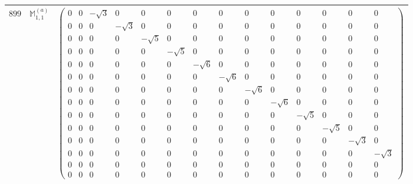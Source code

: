 \documentclass[fleqn,8pt,landscape]{jsarticle}
\begin{document}
\begin{center}
\begin{longtable}{ccc}
$ 899 $ & $ \mathbb{M}_{1,1}^{(a)} $ & $ \begin{pmatrix} 0 & 0 & - \sqrt{3} & 0 & 0 & 0 & 0 & 0 & 0 & 0 & 0 & 0 & 0 & 0 \\ 0 & 0 & 0 & - \sqrt{3} & 0 & 0 & 0 & 0 & 0 & 0 & 0 & 0 & 0 & 0 \\ 0 & 0 & 0 & 0 & - \sqrt{5} & 0 & 0 & 0 & 0 & 0 & 0 & 0 & 0 & 0 \\ 0 & 0 & 0 & 0 & 0 & - \sqrt{5} & 0 & 0 & 0 & 0 & 0 & 0 & 0 & 0 \\ 0 & 0 & 0 & 0 & 0 & 0 & - \sqrt{6} & 0 & 0 & 0 & 0 & 0 & 0 & 0 \\ 0 & 0 & 0 & 0 & 0 & 0 & 0 & - \sqrt{6} & 0 & 0 & 0 & 0 & 0 & 0 \\ 0 & 0 & 0 & 0 & 0 & 0 & 0 & 0 & - \sqrt{6} & 0 & 0 & 0 & 0 & 0 \\ 0 & 0 & 0 & 0 & 0 & 0 & 0 & 0 & 0 & - \sqrt{6} & 0 & 0 & 0 & 0 \\ 0 & 0 & 0 & 0 & 0 & 0 & 0 & 0 & 0 & 0 & - \sqrt{5} & 0 & 0 & 0 \\ 0 & 0 & 0 & 0 & 0 & 0 & 0 & 0 & 0 & 0 & 0 & - \sqrt{5} & 0 & 0 \\ 0 & 0 & 0 & 0 & 0 & 0 & 0 & 0 & 0 & 0 & 0 & 0 & - \sqrt{3} & 0 \\ 0 & 0 & 0 & 0 & 0 & 0 & 0 & 0 & 0 & 0 & 0 & 0 & 0 & - \sqrt{3} \\ 0 & 0 & 0 & 0 & 0 & 0 & 0 & 0 & 0 & 0 & 0 & 0 & 0 & 0 \\ 0 & 0 & 0 & 0 & 0 & 0 & 0 & 0 & 0 & 0 & 0 & 0 & 0 & 0 \end{pmatrix} $ \\ \hline

\end{longtable}
\end{center}
\end{document}
